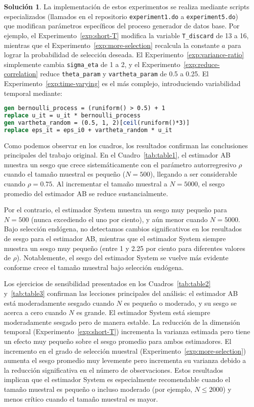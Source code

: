 \documentclass[12pt,letterpaper,reqno,oneside]{amsart}
\theoremstyle{problemstyle} %
\theoremstyle{definition} %
\newtheorem{solution}{Solución}[problem]
\begin{document}
\begin{solution}
  La implementación de estos experimentos se realiza mediante scripts especializados (llamados en el repositorio \texttt{experiment1.do} a \texttt{experiment5.do}) que modifican parámetros específicos del proceso generador de datos base.
  Por ejemplo, el Experimento~\ref{exp:short-T} modifica la variable \texttt{T\_discard} de 13 a 16, mientras que el Experimento~\ref{exp:more-selection} recalcula la constante $a$ para lograr la probabilidad de selección deseada.
  El Experimento~\ref{exp:variance-ratio} simplemente cambia \texttt{sigma\_eta} de 1 a 2, y el Experimento~\ref{exp:reduce-correlation} reduce \texttt{theta\_param} y \texttt{vartheta\_param} de 0.5 a 0.25.
  El Experimento~\ref{exp:time-varying} es el más complejo, introduciendo variabilidad temporal mediante:
  \begin{lstlisting}[language=Stata, basicstyle=\ttfamily]
gen bernoulli_process = (runiform() > 0.5) + 1
replace u_it = u_it * bernoulli_process
gen vartheta_random = (0.5, 1, 2)[ceil(runiform()*3)]
replace eps_it = eps_i0 + vartheta_random * u_it
\end{lstlisting}

  Como podemos observar en los cuadros, los resultados confirman las conclusiones principales del trabajo original.
  En el Cuadro~\ref{tab:table1}, el estimador AB muestra un sesgo que crece sistemáticamente con el parámetro autorregresivo $\rho$ cuando el tamaño muestral es pequeño ($N = 500$), llegando a ser considerable cuando $\rho = 0.75$.
  Al incrementar el tamaño muestral a $N = 5000$, el sesgo promedio del estimador AB se reduce sustancialmente.

  Por el contrario, el estimador System muestra un sesgo muy pequeño para $N = 500$ (nunca excediendo el uno por ciento), y aún menor cuando $N = 5000$.
  Bajo selección endógena, no detectamos cambios significativos en los resultados de sesgo para el estimador AB, mientras que el estimador System siempre muestra un sesgo muy pequeño (entre 1 y 2.25 por ciento para diferentes valores de $\rho$).
  Notablemente, el sesgo del estimador System se vuelve más evidente conforme crece el tamaño muestral bajo selección endógena.

  Los ejercicios de sensibilidad presentados en los Cuadros~\ref{tab:table2} y~\ref{tab:table3} confirman las lecciones principales del análisis: el estimador AB está moderadamente sesgado cuando $N$ es pequeño o moderado, y su sesgo se acerca a cero cuando $N$ es grande.
  El estimador System está siempre moderadamente sesgado pero de manera estable.
  La reducción de la dimensión temporal (Experimento~\ref{exp:short-T}) incrementa la varianza estimada pero tiene un efecto muy pequeño sobre el sesgo promedio para ambos estimadores.
  El incremento en el grado de selección muestral (Experimento~\ref{exp:more-selection}) aumenta el sesgo promedio muy levemente pero incrementa su varianza debido a la reducción significativa en el número de observaciones.
  Estos resultados implican que el estimador System es especialmente recomendable cuando el tamaño muestral es pequeño o incluso moderado (por ejemplo, $N \leq 2000$) y menos crítico cuando el tamaño muestral es mayor.

\end{solution}
\end{document}
